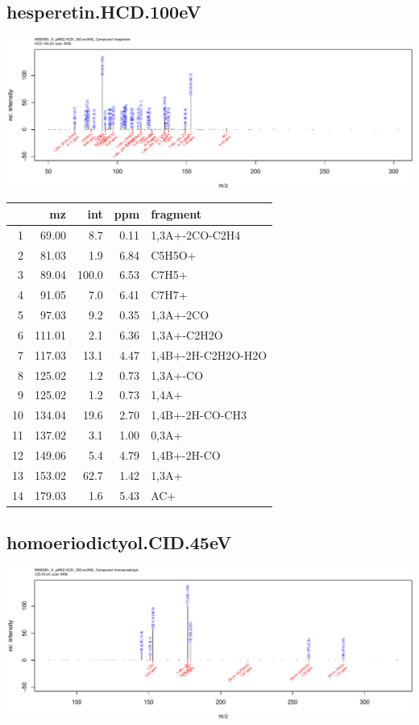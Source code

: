 \documentclass[]{article}
\begin{document}
\clearpage\subsection{hesperetin.HCD.100eV}
\includegraphics[width=\textwidth]{WEB350_files/figure-latex/unnamed-chunk-3-9}

\begin{table}[ht]
\centering
\begin{tabular}{rrrrl}
  \toprule
 & mz & int & ppm & fragment \\ 
  \midrule
1 & 69.00 & 8.7 & 0.11 & 1,3A+-2CO-C2H4 \\ 
  2 & 81.03 & 1.9 & 6.84 & C5H5O+ \\ 
  3 & 89.04 & 100.0 & 6.53 & C7H5+ \\ 
  4 & 91.05 & 7.0 & 6.41 & C7H7+ \\ 
  5 & 97.03 & 9.2 & 0.35 & 1,3A+-2CO \\ 
  6 & 111.01 & 2.1 & 6.36 & 1,3A+-C2H2O \\ 
  7 & 117.03 & 13.1 & 4.47 & 1,4B+-2H-C2H2O-H2O \\ 
  8 & 125.02 & 1.2 & 0.73 & 1,3A+-CO \\ 
  9 & 125.02 & 1.2 & 0.73 & 1,4A+ \\ 
  10 & 134.04 & 19.6 & 2.70 & 1,4B+-2H-CO-CH3 \\ 
  11 & 137.02 & 3.1 & 1.00 & 0,3A+ \\ 
  12 & 149.06 & 5.4 & 4.79 & 1,4B+-2H-CO \\ 
  13 & 153.02 & 62.7 & 1.42 & 1,3A+ \\ 
  14 & 179.03 & 1.6 & 5.43 & AC+ \\ 
   \bottomrule
\end{tabular}
\end{table}

\clearpage\subsection{homoeriodictyol.CID.45eV}
\includegraphics[width=\textwidth]{WEB350_files/figure-latex/unnamed-chunk-3-10}
\end{document}
